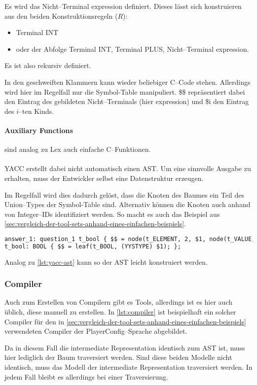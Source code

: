 Es wird das Nicht--Terminal {\ttfamily expression} definiert.
Dieses lässt sich konstruieren aus den beiden Konstruktionsregeln ($R$):
\begin{itemize}
    \item Terminal {\ttfamily INT}
    \item oder der Abfolge Terminal {\ttfamily INT}, Terminal {\ttfamily PLUS}, Nicht--Terminal {\ttfamily expression}.
\end{itemize}
Es ist also rekursiv definiert.

In den geschweiften Klammern kann wieder beliebiger C--Code stehen.
Allerdings wird hier im Regelfall nur die Symbol-Table manipuliert.
{\ttfamily \$\$} repräsentiert dabei den Eintrag des gebildeten Nicht--Terminals (hier {\ttfamily expression}) und {\ttfamily \$i} den Eintrag des $i$--ten Kinds.

\paragraph{Auxiliary Functions} sind analog zu Lex auch einfache C--Funktionen.

\paragraph*{}
\ac{YACC} erstellt dabei nicht automatisch einen \ac{AST}.
Um eine sinnvolle Ausgabe zu erhalten, muss der Entwickler selbst eine Datenstruktur erzeugen.

Im Regelfall wird dies dadurch gelöst, dass die Knoten des Baumes ein Teil des Union--Types der Symbol-Table sind.
Alternativ können die Knoten auch anhand von Integer--IDs identifiziert werden.
So macht es auch das Beispiel aus \autoref{sec:vergleich-der-tool-sets-anhand-eines-einfachen-beispiels}.
\begin{lstlisting}[label={lst:yacc-ast},caption={\acs{YACC} \acs{AST}},language=yacc]
answer_1: question_1 t_bool { $$ = node(t_ELEMENT, 2, $1, node(t_VALUE, 1, $2)); };
t_bool: BOOL { $$ = leaf(t_BOOL, (YYSTYPE) $1); };
\end{lstlisting}
Analog zu \autoref{lst:yacc-ast} kann so der \ac{AST} leicht konstruiert werden.

\subsubsection{Compiler}
Auch zum Erstellen von Compilern gibt es Tools, allerdings ist es hier auch üblich, diese manuell zu erstellen.
In \autoref{lst:compiler} ist beispielhaft ein solcher Compiler für den in \autoref{sec:vergleich-der-tool-sets-anhand-eines-einfachen-beispiels} verwendeten Compiler der PlayerConfig--Sprache abgebildet.

Da in diesem Fall die intermediate Representation identisch zum \ac{AST} ist, muss hier lediglich der Baum traversiert werden.
Sind diese beiden Modelle nicht identisch, muss das Modell der intermediate Representation traversiert werden.
In jedem Fall bleibt es allerdings bei einer Traversierung.

